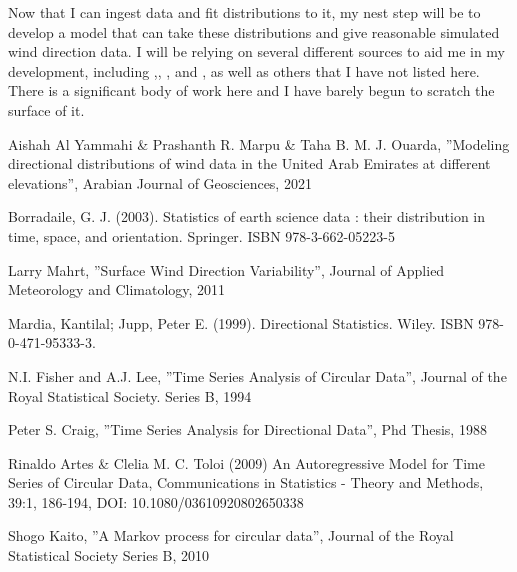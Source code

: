 \documentclass[11pt]{article}
\begin{document}
Now that I can ingest data and fit distributions to it, my nest step will be to develop a model that can take these distributions and give reasonable simulated wind direction data. I will be relying on several different sources to aid me in my development, including \cite{Al Yammahi},\cite{Craig}, \cite{Kantilal}, and \cite{Rinaldo}, as well as others that I have not listed here. There is a significant body of work here and I have barely begun to scratch the surface of it. 



\begin{thebibliography}{1}

 Aishah Al Yammahi \& Prashanth R. Marpu \& Taha B. M. J. Ouarda, ''Modeling directional distributions of wind data in the United
Arab Emirates at different elevations'', Arabian Journal of Geosciences, 2021

 Borradaile, G. J. (2003). Statistics of earth science data : their distribution in time, space, and orientation. Springer. ISBN 978-3-662-05223-5

 Larry Mahrt, ''Surface Wind Direction Variability'',  Journal of Applied Meteorology and Climatology, 2011

Mardia, Kantilal; Jupp, Peter E. (1999). Directional Statistics. Wiley. ISBN 978-0-471-95333-3.

 N.I. Fisher and A.J. Lee, ''Time Series Analysis of Circular Data'', Journal of the Royal Statistical Society. Series B, 1994

 Peter S. Craig, ''Time Series Analysis for Directional Data'', Phd Thesis, 1988

 Rinaldo Artes \& Clelia M. C. Toloi (2009) An Autoregressive Model for Time
Series of Circular Data, Communications in Statistics - Theory and Methods, 39:1, 186-194, DOI:
10.1080/03610920802650338

 Shogo Kaito, ''A Markov process for circular data'', Journal of the Royal Statistical Society Series B, 2010
\end{thebibliography}
\end{document}
